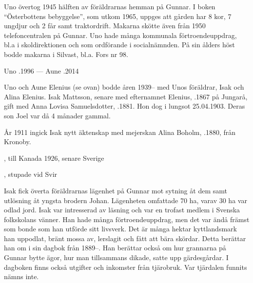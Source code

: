 Uno övertog 1945 hälften av föräldrarnas hemman på Gunnar. I boken ``Österbottens bebyggelse'', som utkom 1965, uppges att gården har 8 kor, 7 ungdjur och 2 får samt traktordrift. Makarna skötte även från 1950 telefoncentralen på Gunnar. Uno hade många kommunala förtroendeuppdrag, bl.a i skoldirektionen och som ordförande i socialnämnden. På sin ålders höst bodde makarna i Silvast, bl.a. Fors nr 98.

Uno .1996  ---  Aune .2014



%
Uno och Aune Elenius (se ovan) bodde åren 1939-- med Unos föräldrar, Isak och Alina Elenius. Isak Mattsson, senare med efternamnet Elenius, .1867 på Jungarå, gift med Anna Lovisa Samuelsdotter, .1881. Hon dog i lungsot 25.04.1903. Deras son Joel var då 4 månader gammal.

År 1911 ingick Isak nytt äktenskap med mejerskan Alina Boholm, .1880, från Kronoby.
\begin{jhchildren}
  \item {}, till Kanada 1926, senare Sverige
  \item {}
  \item {}
  \item {}
  \item {}, stupade vid Svir
  \item {}
\end{jhchildren}

Isak fick överta föräldrarnas lägenhet på Gunnar mot sytning åt dem samt utlösning åt yngsta brodern Johan. Lägenheten omfattade 70 ha, varav 30 ha var odlad jord. Isak var intresserad av läsning och var en trofast medlem i Svenska folkskolans vänner. Han hade många förtroendeuppdrag, men det var ändå främst som bonde som han utförde sitt livsverk. Det är många hektar kyttlandsmark han uppodlat, bränt mossa av, lerslagit och fått att bära skördar. Detta berättar han om i sin dagbok från 1889--. Han berättar också om  hur grannarna på Gunnar bytte ägor, hur man tillsammans dikade, satte upp gärdesgårdar. I dagboken finns också utgifter och inkomster från tjärobruk. Var tjärdalen funnits nämns	inte.

